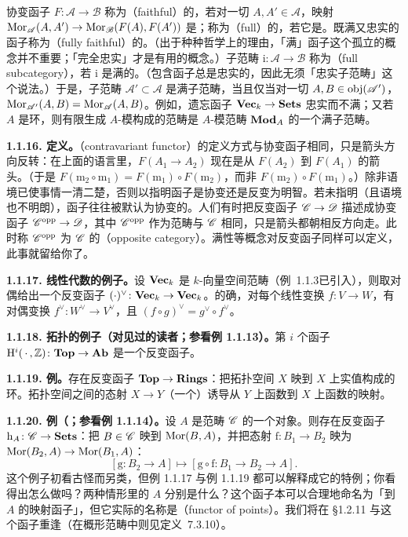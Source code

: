 协变函子 $F\colon\mathscr{A}\to\mathscr{B}$ 称为\textbf{\trFaithful}（faithful）的，若对一切 $A,A'\in\mathscr{A}$，映射 $\operatorname{Mor}_{\mathscr{A}}(A,A')\to\operatorname{Mor}_{\mathscr{B}}(F(A),F(A'))$ 是\trInjectiveMap；称为\textbf{\trFull}（full）的，若它是\trSurjectiveMap。既满又忠实的函子称为\textbf{\trFullyFaithful}（fully faithful）的。（出于种种哲学上的理由，「满」函子这个孤立的概念并不重要；「完全忠实」才是有用的概念。）子范畴 $\mathrm{i}\colon\mathscr{A}\to\mathscr{B}$ 称为\textbf{\trFullSubcategory}（full subcategory），若 $\mathrm{i}$ 是满的。（包含函子总是忠实的，因此无须「忠实子范畴」这个说法。）于是，子范畴 $\mathscr{A}'\subset\mathscr{A}$ 是满子范畴，当且仅当对一切 $A,B\in\operatorname{obj}(\mathscr{A}')$，$\operatorname{Mor}_{\mathscr{A}'}(A,B)=\operatorname{Mor}_{\mathscr{A}}(A,B)$。例如，遗忘函子 $\mathbf{Vec}_k\to\mathbf{Sets}$ 忠实而不满；又若 $A$ 是环，则有限生成 $A$-模构成的范畴是 $A$-模范畴 $\mathbf{Mod}_{A}$ 的一个满子范畴。

\textbf{1.1.16. 定义。}\quad \textbf{\trContravariantFunctor}（contravariant functor）的定义方式与协变函子相同，只是箭头方向反转：在上面的语言里，$F(A_1\to A_2)$ 现在是从 $F(A_2)$ 到 $F(A_1)$ 的箭头。（于是 $F(\mathrm{m}_2\circ\mathrm{m}_1)=F(\mathrm{m}_1)\circ F(\mathrm{m}_2)$，而非 $F(\mathrm{m}_2)\circ F(\mathrm{m}_1)$。）除非语境已使事情一清二楚，否则以指明函子是协变还是反变为明智。若未指明（且语境也不明朗），函子往往被默认为协变的。人们有时把反变函子 $\mathscr{C}\to\mathscr{D}$ 描述成协变函子 $\mathscr{C}^{\mathrm{opp}}\to\mathscr{D}$，其中 $\mathscr{C}^{\mathrm{opp}}$ 作为范畴与 $\mathscr{C}$ 相同，只是箭头都朝相反方向走。此时称 $\mathscr{C}^{\mathrm{opp}}$ 为 $\mathscr{C}$ 的\textbf{\trOppositeCategory}（opposite category）。满性等概念对反变函子同样可以定义，此事就留给你了。

\textbf{1.1.17. 线性代数的例子。}\quad 设 $\mathbf{Vec}_k$ 是 $k$-向量空间范畴（例~1.1.3已引入），则取对偶给出一个反变函子 $(\cdot)^{\vee}\colon\mathbf{Vec}_k\to\mathbf{Vec}_k$。的确，对每个线性变换 $f\colon V\to W$，有对偶变换 $f^{\vee}\colon W^{\vee}\to V^{\vee}$，且 $(f\circ g)^{\vee}=g^{\vee}\circ f^{\vee}$。

\textbf{1.1.18. 拓扑的例子（对见过\trCohomology{}的读者；参看例 1.1.13）。}\quad 第 $i$ 个\trCohomology{}函子 $\mathrm{H}^i(\,\cdot\,,\mathbb{Z})\colon\mathbf{Top}\to\mathbf{Ab}$ 是一个反变函子。

\textbf{1.1.19. 例。}\quad 存在反变函子 $\mathbf{Top}\to\mathbf{Rings}$：把拓扑空间 $X$ 映到 $X$ 上实值\trContinuousMap{}构成的环。拓扑空间之间的态射 $X\to Y$（一个\trContinuousMap）诱导从 $Y$ 上函数到 $X$ 上函数的\trPullback{}映射。

\textbf{1.1.20. 例（\trFunctorOfPoints{}；参看例 1.1.14）。}\quad 设 $A$ 是范畴 $\mathscr{C}$ 的一个对象。则存在反变函子 $\mathrm{h}_A\colon\mathscr{C}\to\mathbf{Sets}$：把 $B\in\mathscr{C}$ 映到 $\operatorname{Mor}(B,A)$，并把态射 $\mathrm{f}\colon B_1\to B_2$ 映为 $\operatorname{Mor}(B_2,A)\to\operatorname{Mor}(B_1,A)$：
\[
[\mathrm{g}\colon B_2\to A] \longmapsto [\mathrm{g}\circ\mathrm{f}\colon B_1\to B_2\to A].
\]
这个例子初看古怪而另类，但例 1.1.17 与例 1.1.19 都可以解释成它的特例；你看得出怎么做吗？两种情形里的 $A$ 分别是什么？这个函子本可以合理地命名为「到 $A$ 的映射函子」，但它实际的名称是\textbf{\trFunctorOfPoints}（functor of points）。我们将在 \S1.2.11 与这个函子重逢（在概形范畴中则见定义~7.3.10）。

